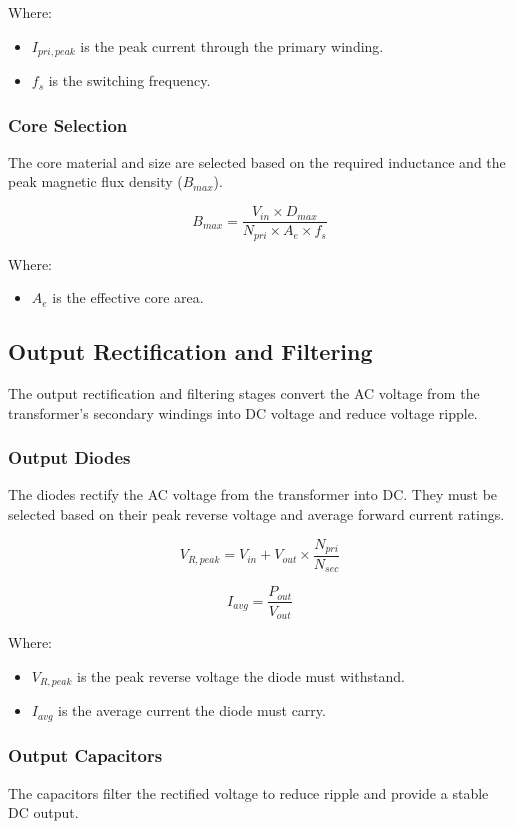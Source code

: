 \documentclass{article}
\begin{document}
Where:
\begin{itemize}
    \item $I_{pri, peak}$ is the peak current through the primary winding.
    \item $f_s$ is the switching frequency.
\end{itemize}

\subsubsection{Core Selection}
The core material and size are selected based on the required inductance and the peak magnetic flux density ($B_{max}$).

\[
B_{max} = \frac{V_{in} \times D_{max}}{N_{pri} \times A_e \times f_s}
\]

Where:
\begin{itemize}
    \item $A_e$ is the effective core area.
\end{itemize}

\subsection{Output Rectification and Filtering}
The output rectification and filtering stages convert the AC voltage from the transformer’s secondary windings into DC voltage and reduce voltage ripple.

\subsubsection{Output Diodes}
The diodes rectify the AC voltage from the transformer into DC. They must be selected based on their peak reverse voltage and average forward current ratings.

\[
V_{R, peak} = V_{in} + V_{out} \times \frac{N_{pri}}{N_{sec}}
\]

\[
I_{avg} = \frac{P_{out}}{V_{out}}
\]

Where:
\begin{itemize}
    \item $V_{R, peak}$ is the peak reverse voltage the diode must withstand.
    \item $I_{avg}$ is the average current the diode must carry.
\end{itemize}

\subsubsection{Output Capacitors}
The capacitors filter the rectified voltage to reduce ripple and provide a stable DC output.
\end{document}
